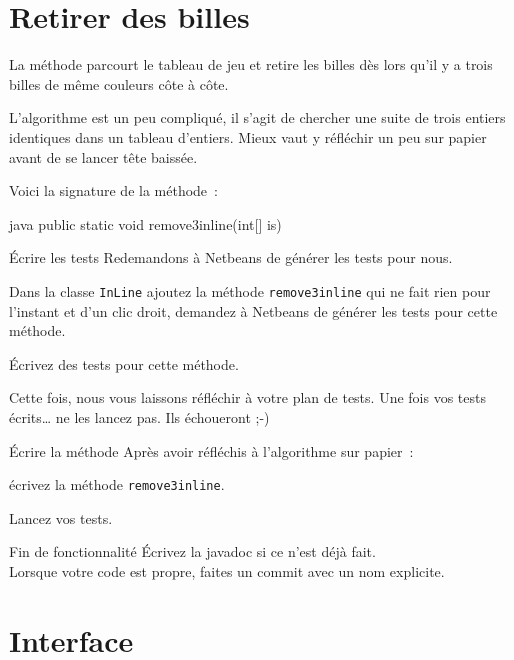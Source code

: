 \documentclass[a4paper,11pt]{style-esi/td}
\newcommand{\findefonctionnalite}{
\begin{infoit}{Fin de fonctionnalité}
	Écrivez la javadoc si ce n'est déjà fait.\\  
	Lorsque votre code est propre, faites un commit avec un nom explicite. 
\end{infoit}
}
\begin{document}
\section{Retirer des billes}

La méthode  parcourt le tableau de jeu et retire les
billes dès lors qu'il y a trois billes de même couleurs côte à côte. 

L'algorithme est un peu compliqué, il s'agit de chercher une suite de trois
entiers identiques dans un tableau d'entiers. Mieux vaut y réfléchir un peu sur
papier avant de se lancer tête baissée. 

Voici la signature de la méthode~:
\begin{Code}{java}
	public static void remove3inline(int[] is)
\end{Code}

\begin{Exercice}{Écrire les tests}
	Redemandons à Netbeans de générer les tests pour nous.
	\begin{steps}		
		\item Dans la classe \texttt{InLine} ajoutez la méthode 
			\texttt{remove3inline}
			qui ne fait rien pour l'instant et d'un clic droit, demandez
			à Netbeans de générer les tests pour cette méthode. 

		\item Écrivez des tests pour cette méthode.
	\end{steps}

	Cette fois, nous vous laissons réfléchir à votre plan de tests. Une fois
	vos tests écrits… ne les lancez pas. Ils échoueront ;-)

\end{Exercice}

\begin{Exercice}{Écrire la méthode}
	Après avoir réfléchis à l'algorithme sur papier : 
	\begin{steps}
	\item écrivez la méthode \texttt{remove3inline}.
	\item Lancez vos tests. 
	\end{steps}
\end{Exercice}

\findefonctionnalite 



\section{Interface}
\end{document}
